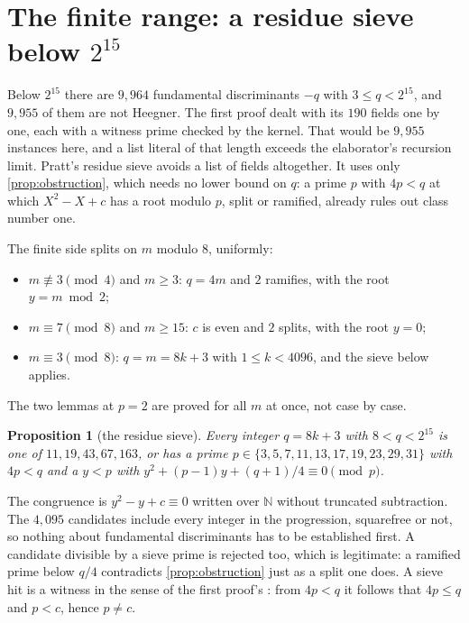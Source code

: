 \documentclass[11pt]{article}
\newtheorem{proposition}[theorem]{Proposition}
\theoremstyle{definition}
\newcommand{\N}{\mathbb{N}}
\begin{document}
\section{The finite range: a residue sieve below \texorpdfstring{$2^{15}$}{2\^{}15}}\label{sec:finite}

Below $2^{15}$ there are $9{,}964$ fundamental discriminants $-q$ with $3 \le q < 2^{15}$, and $9{,}955$ of them are not Heegner. The first proof dealt with its $190$ fields one by one, each with a witness prime checked by the kernel. That would be $9{,}955$ instances here, and a list literal of that length exceeds the elaborator's recursion limit. Pratt's residue sieve avoids a list of fields altogether. It uses only \cref{prop:obstruction}, which needs no lower bound on $q$: a prime $p$ with $4p < q$ at which $X^2 - X + c$ has a root modulo $p$, split or ramified, already rules out class number one.

The finite side splits on $m$ modulo $8$, uniformly:
\begin{itemize}[nosep]
\item $m \not\equiv 3 \pmod 4$ and $m \ge 3$: $q = 4m$ and $2$ ramifies, with the root $y = m \bmod 2$;
\item $m \equiv 7 \pmod 8$ and $m \ge 15$: $c$ is even and $2$ splits, with the root $y = 0$;
\item $m \equiv 3 \pmod 8$: $q = m = 8k + 3$ with $1 \le k < 4096$, and the sieve below applies.
\end{itemize}
The two lemmas at $p = 2$ are proved for all $m$ at once, not case by case.

\begin{proposition}[the residue sieve]\label{prop:sieve}
Every integer $q = 8k + 3$ with $8 < q < 2^{15}$ is one of $11, 19, 43, 67, 163$, or has a prime $p \in \{3, 5, 7, 11, 13, 17, 19, 23, 29, 31\}$ with $4p < q$ and a $y < p$ with $y^2 + (p-1)y + (q+1)/4 \equiv 0 \pmod p$.
\end{proposition}

The congruence is $y^2 - y + c \equiv 0$ written over $\N$ without truncated subtraction. The $4{,}095$ candidates include every integer in the progression, squarefree or not, so nothing about fundamental discriminants has to be established first. A candidate divisible by a sieve prime is rejected too, which is legitimate: a ramified prime below $q/4$ contradicts \cref{prop:obstruction} just as a split one does. A sieve hit is a witness in the sense of the first proof's : from $4p < q$ it follows that $4p \le q$ and $p < c$, hence $p \ne c$.
\end{document}

